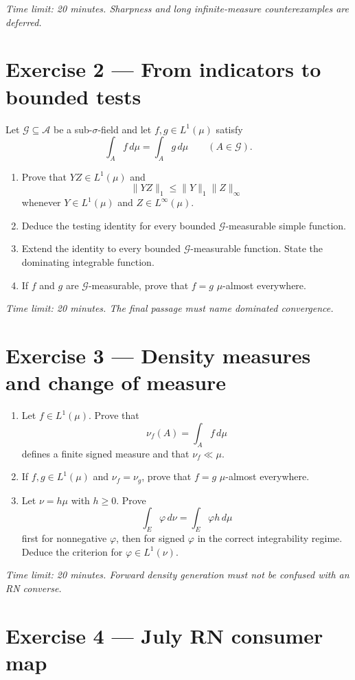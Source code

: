 \emph{Time limit: 20 minutes. Sharpness and long infinite-measure counterexamples are deferred.}

\section*{Exercise 2 — From indicators to bounded tests}

Let $\mathcal G\subseteq\mathcal A$ be a sub-$\sigma$-field and let $f,g\in L^1(\mu)$ satisfy
\[
\int_Af\,d\mu
=
\int_Ag\,d\mu
\qquad(A\in\mathcal G).
\]
\begin{enumerate}
  \item Prove that $YZ\in L^1(\mu)$ and
  \[
  \|YZ\|_1\le\|Y\|_1\|Z\|_\infty
  \]
  whenever $Y\in L^1(\mu)$ and $Z\in L^\infty(\mu)$.
  \item Deduce the testing identity for every bounded $\mathcal G$-measurable simple function.
  \item Extend the identity to every bounded $\mathcal G$-measurable function. State the dominating integrable function.
  \item If $f$ and $g$ are $\mathcal G$-measurable, prove that $f=g$ $\mu$-almost everywhere.
\end{enumerate}

\emph{Time limit: 20 minutes. The final passage must name dominated convergence.}

\section*{Exercise 3 — Density measures and change of measure}

\begin{enumerate}
  \item Let $f\in L^1(\mu)$. Prove that
  \[
  \nu_f(A)=\int_Af\,d\mu
  \]
  defines a finite signed measure and that $\nu_f\ll\mu$.
  \item If $f,g\in L^1(\mu)$ and $\nu_f=\nu_g$, prove that $f=g$ $\mu$-almost everywhere.
  \item Let $\nu=h\mu$ with $h\ge0$. Prove
  \[
  \int_E\varphi\,d\nu
  =
  \int_E\varphi h\,d\mu
  \]
  first for nonnegative $\varphi$, then for signed $\varphi$ in the correct integrability regime. Deduce the criterion for $\varphi\in L^1(\nu)$.
\end{enumerate}

\emph{Time limit: 20 minutes. Forward density generation must not be confused with an RN converse.}

\section*{Exercise 4 — July RN consumer map}

